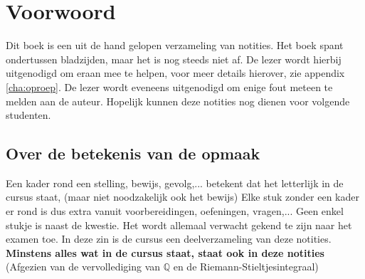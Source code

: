 \documentclass[main.tex]{subfiles}
\begin{document}
\section*{Voorwoord}
\label{sec:voorwoord}

Dit boek is een uit de hand gelopen verzameling van notities.
Het boek spant ondertussen \pageref{LastPage} bladzijden, maar het is nog steeds niet af.
De lezer wordt hierbij uitgenodigd om eraan mee te helpen, voor meer details hierover, zie appendix \ref{cha:oproep}.
De lezer wordt eveneens uitgenodigd om enige fout meteen te melden aan de auteur.
Hopelijk kunnen deze notities nog dienen voor volgende studenten.

\subsection*{Over de betekenis van de opmaak}
\label{sec:over-de-betekenis}

Een kader rond een stelling, bewijs, gevolg,... betekent dat het letterlijk in de cursus staat, (maar niet noodzakelijk ook het bewijs)
Elke stuk zonder een kader er rond is dus extra vanuit voorbereidingen, oefeningen, vragen,... 
Geen enkel stukje is naast de kwestie.
Het wordt allemaal verwacht gekend te zijn naar het examen toe.
In deze zin is de cursus een deelverzameling van deze notities.
\textbf{Minstens alles wat in de cursus staat, staat ook in deze notities}
(Afgezien van de vervollediging van $\mathbb{Q}$ en de Riemann-Stieltjesintegraal)
\end{document}
